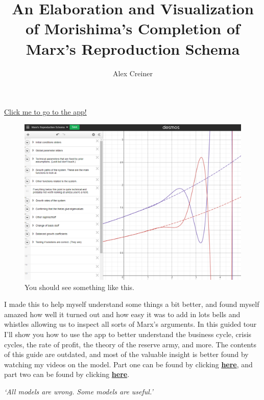 \documentclass{article}
\title{An Elaboration and Visualization of Morishima's Completion of Marx's Reproduction Schema}
\author{Alex Creiner}
\theoremstyle{theorem}
\begin{document}
\maketitle
\href{https://www.desmos.com/calculator/wygiqzniwt}{\color{blue} \LARGE Click me to go to the app!} 
\begin{figure}[H]
\centering
\includegraphics[scale=.5]{Images/introduction}
\caption{You should see something like this.}
\end{figure}
I made this to help myself understand some things a bit better, and found myself amazed how well it turned out and how easy it was to add in lots bells and whistles allowing us to inspect all sorts of Marx's arguments. In this guided tour I'll show you how to use the app to better understand the business cycle, crisis cycles, the rate of profit, the theory of the reserve army, and more. The contents of this guide are outdated, and most of the valuable insight is better found by watching my videos on the model. Part one can be found by clicking \href{https://youtu.be/8KstZV8MjIs}{\textbf{here}}, and part two can be found by clicking \href{https://youtu.be/y2ECuu6dSdo}{\textbf{here}}. 
\begin{center}
	\emph{`All models are wrong. Some models are useful.'}
\end{center}
\end{document}
